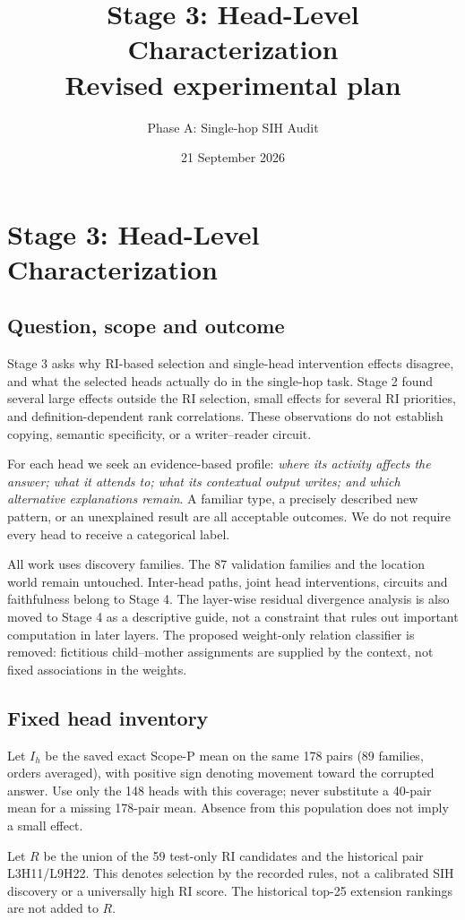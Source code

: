 \documentclass[11pt,a4paper]{article}
\title{Stage 3: Head-Level Characterization\\\large Revised experimental plan}
\author{Phase A: Single-hop SIH Audit}
\date{21 September 2026}
\begin{document}
\maketitle
\section{Stage 3: Head-Level Characterization}

\subsection{Question, scope and outcome}
Stage 3 asks why RI-based selection and single-head intervention effects disagree,
and what the selected heads actually do in the single-hop task. Stage 2 found
several large effects outside the RI selection, small effects for several RI
priorities, and definition-dependent rank correlations. These observations do
not establish copying, semantic specificity, or a writer--reader circuit.

For each head we seek an evidence-based profile: \emph{where its activity affects
the answer; what it attends to; what its contextual output writes; and which
alternative explanations remain}. A familiar type, a precisely described new
pattern, or an unexplained result are all acceptable outcomes. We do not require
every head to receive a categorical label.

All work uses discovery families. The 87 validation families and the location
world remain untouched. Inter-head paths, joint head interventions, circuits and
faithfulness belong to Stage 4. The layer-wise residual divergence analysis is
also moved to Stage 4 as a descriptive guide, not a constraint that rules out
important computation in later layers. The proposed weight-only relation
classifier is removed: fictitious child--mother assignments are supplied by the
context, not fixed associations in the weights.

\subsection{Fixed head inventory}
Let $I_h$ be the saved exact Scope-P mean on the same 178 pairs (89 families,
orders averaged), with positive sign denoting movement toward the corrupted
answer. Use only the 148 heads with this coverage; never substitute a 40-pair
mean for a missing 178-pair mean. Absence from this population does not imply a
small effect.

Let $R$ be the union of the 59 test-only RI candidates and the historical
pair L3H11/L9H22. This denotes selection by the recorded rules, not a calibrated
SIH discovery or a universally high RI score. The historical top-25 extension
rankings are not added to $R$.
\end{document}
